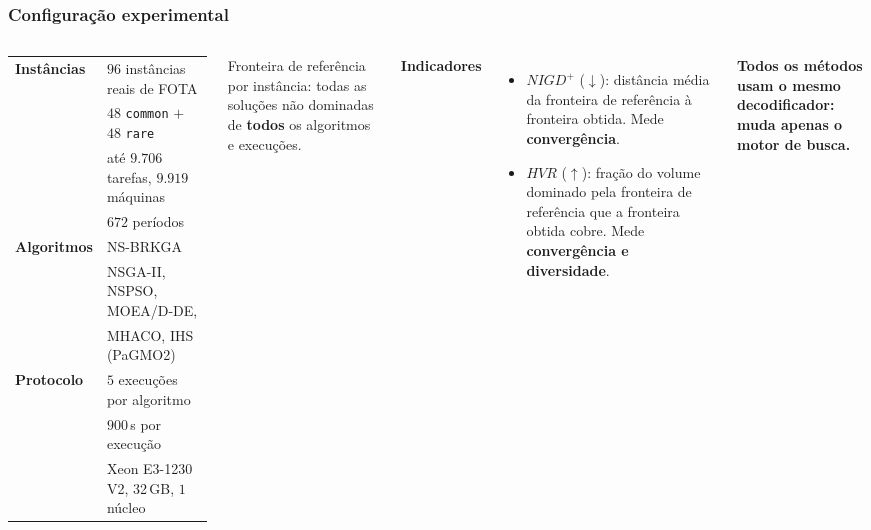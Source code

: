 \documentclass[
	11pt,
	aspectratio=169, %
]{beamer}
\newcommand{\NIGDplus}{\mathit{NIGD^{+}}}
\newcommand{\HVR}{\mathit{HVR}}
\newcommand{\alg}[1]{#1}
\newcommand{\takeaway}[1]{%
  \vspace{0.35em}%
  \begin{center}%
  \colorbox{mylightorange1!40}{%
    \parbox{0.90\textwidth}{\centering\small\textbf{#1}}}%
  \end{center}%
}
\begin{document}
\begin{frame}
\frametitle{Configura\c{c}\~ao experimental}

\begin{columns}[T,onlytextwidth]
\small
\begin{tabular}{@{} l l @{}}
\toprule
\textbf{Inst\^ancias} & $96$ inst\^ancias reais de FOTA \\
 & $48$ \texttt{common} $+$ $48$ \texttt{rare} \\
 & at\'e $9{.}706$ tarefas, $9{.}919$ m\'aquinas \\
 & $672$ per\'iodos \\
\addlinespace
\textbf{Algoritmos} & \alg{NS-BRKGA} \\
 & \alg{NSGA-II}, \alg{NSPSO}, \alg{MOEA/D-DE}, \\
 & \alg{MHACO}, \alg{IHS} \; (PaGMO2) \\
\addlinespace
\textbf{Protocolo} & $5$ execu\c{c}\~oes por algoritmo \\
 & $900$\,s por execu\c{c}\~ao \\
 & Xeon E3-1230 V2, 32\,GB, $1$ n\'ucleo \\
\bottomrule
\end{tabular}

\medskip

{\footnotesize Fronteira de refer\^encia por inst\^ancia: todas as solu\c{c}\~oes
n\~ao dominadas de \textbf{todos} os algoritmos e execu\c{c}\~oes.}

\small
\textbf{Indicadores}

\smallskip

\begin{itemize}\setlength{\itemsep}{6pt}
\item $\NIGDplus$ ($\downarrow$): dist\^ancia m\'edia da fronteira de
      refer\^encia \`a fronteira obtida. Mede \textbf{converg\^encia}.
\item $\HVR$ ($\uparrow$): fra\c{c}\~ao do volume dominado pela fronteira de
      refer\^encia que a fronteira obtida cobre. Mede
      \textbf{converg\^encia e diversidade}.
\end{itemize}

\medskip

\takeaway{Todos os m\'etodos usam o \textbf{mesmo decodificador}: muda apenas o
motor de busca.}

\end{columns}

\end{frame}
\end{document}
